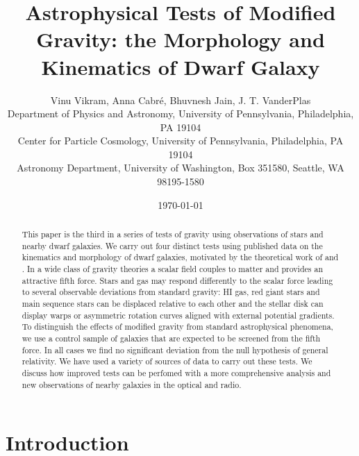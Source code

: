 \documentclass[useAMS,usenatbib,twocolumn]{mn2e}
\begin{document}
\title[Astrophysical Tests of Modified Gravity]{Astrophysical Tests
of Modified Gravity: the Morphology and Kinematics of Dwarf Galaxy} 
\author[Vikram, V. {\it et al.}]{Vinu Vikram, Anna Cabr\'e, Bhuvnesh Jain, J.
T. VanderPlas \\
 Department of Physics and Astronomy, University of Pennsylvania, 
 Philadelphia, PA 19104\\
 Center for Particle Cosmology, University of Pennsylvania, 
 Philadelphia, PA 19104\\
 Astronomy Department, University of Washington, Box 351580,
 Seattle, WA 98195-1580}

\date{\today}
\maketitle


\begin{abstract}
This paper is the third in a series of tests of gravity using observations of 
stars and nearby
dwarf galaxies. We carry out four distinct tests using published data on the
kinematics
and morphology of dwarf galaxies, motivated by the theoretical work of
\citet{hui09} and \citet{bhuvjake2011}. In a wide class of
gravity theories a scalar field couples to matter and provides an attractive
fifth force. Stars and gas may respond differently to the scalar force leading to 
several observable deviations from standard gravity: 
HI gas, red giant stars and main sequence stars
can be displaced relative to each other and 
the stellar disk can display warps or asymmetric rotation curves aligned with
external potential gradients.  
To distinguish the effects of modified
gravity from standard astrophysical phenomena, we use a control sample of
galaxies that are expected to be screened from the fifth force.
In all cases we find no significant deviation
from the null hypothesis of general relativity. We have used a variety of
sources of data to carry out these tests. We discuss how 
improved tests can be perfomed with a more comprehensive analysis and
new observations of nearby galaxies in the optical and radio. 
\end{abstract}

\section{Introduction}
\end{document}
